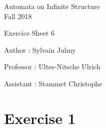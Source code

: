 \documentclass[a4paper,11pt]{report}
\author{Sylvain Julmy}
\date{\today}
\begin{document}
\begin{center}
\Large{
    Automata on Infinite Structure\\
    Fall 2018
  }
  
  \noindent\makebox[\linewidth]{\rule{\linewidth}{0.4pt}}
  Exercice Sheet 6

  \vspace*{1.4cm}

  Author : Sylvain Julmy
  \noindent\makebox[\linewidth]{\rule{\linewidth}{0.4pt}}

  \begin{flushleft}
    Professor : Ultes-Nitsche Ulrich
    
    Assistant : Stammet Christophe
  \end{flushleft}

  \noindent\makebox[\linewidth]{\rule{\textwidth}{1pt}}
\end{center}

\section*{Exercise 1}
\end{document}
